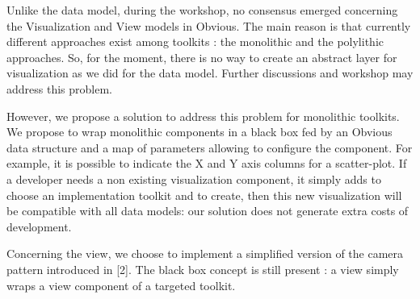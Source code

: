 Unlike the data model, during the workshop, no consensus emerged concerning the Visualization and View models in Obvious. The main reason is that currently different approaches exist among toolkits : the monolithic and the polylithic approaches. So, for the moment, there is no way to create an abstract layer for visualization as we did for the data model. Further discussions and workshop may address this problem.

However, we propose a solution to address this problem for monolithic toolkits. We propose to wrap monolithic components in a black box fed by an Obvious data structure and a map of parameters allowing to configure the component. For example, it is possible to indicate the X and Y axis columns for a scatter-plot. If a developer needs a non existing visualization component, it simply adds to choose an implementation toolkit and to create, then this new visualization will be compatible with all data models: our solution does not generate extra costs of development.

Concerning the view, we choose to implement a simplified version of the camera pattern introduced in [2]. The black box concept is still present : a view simply wraps a view component of a targeted toolkit.